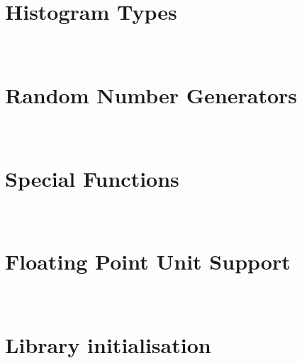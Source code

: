 \documentclass[hyperref]{manual}
\makeatletter
\let\py@OldOldChapter=\chapter
\renewcommand{\chapter}{\py@reset%
                        \py@OldOldChapter}
\makeatother
\begin{document}
\chapter[\protect\module{pygsl.histogram} --- Histogram Types]
{\protect{} \\ Histogram Types}
\label{cha:histogram-module}


\chapter[\protect\module{pygsl.rng} --- Random Number Generators]
{\protect{} \\ Random Number Generators}
\label{cha:rng-module}


\chapter[\protect\module{pygsl.sf} --- Special Functions]
{\protect{} \\ Special Functions}
\label{cha:sf-module}





\appendix

\chapter[\protect\module{pygsl.ieee} --- Floating Point Unit Support]
{\protect{} \\ Floating Point Unit Support}
\label{cha:ieee-module}


\chapter[\protect\module{pygsl.init} --- Library initialisation]
{\protect{} \\ Library initialisation}
\label{cha:library-initialisation}






\end{document}
